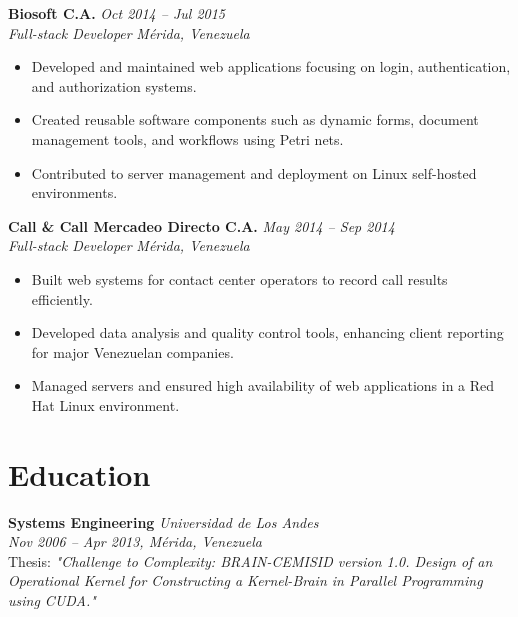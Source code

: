 \documentclass[a4paper,10pt]{article}
\begin{document}
\textbf{Biosoft C.A.} \hfill \textit{Oct 2014 -- Jul 2015}\\
\textit{Full-stack Developer} \hfill \textit{Mérida, Venezuela}\\
\begin{itemize}[leftmargin=0.5cm, topsep=0pt, parsep=0pt, itemsep=2pt]
	\item Developed and maintained web applications focusing on login,
	      authentication, and authorization systems.
	\item Created reusable software components such as dynamic forms, document
	      management tools, and workflows using Petri nets.
	\item Contributed to server management and deployment on Linux self-hosted
	      environments.
\end{itemize}

\textbf{Call \& Call Mercadeo Directo C.A.} \hfill \textit{May 2014 -- Sep 2014}\\
\textit{Full-stack Developer} \hfill \textit{Mérida, Venezuela}\\
\begin{itemize}[leftmargin=0.5cm, topsep=0pt, parsep=0pt, itemsep=2pt]
	\item Built web systems for contact center operators to record call results
	      efficiently.
	\item Developed data analysis and quality control tools, enhancing client
	      reporting for major Venezuelan companies.
	\item Managed servers and ensured high availability of web applications in
	      a Red Hat Linux environment.
\end{itemize}

\section*{Education}
\sectionline
\textbf{Systems Engineering} \hfill \textit{Universidad de Los Andes}\\
\textit{Nov 2006 -- Apr 2013, Mérida, Venezuela}\\
Thesis: \textit{"Challenge to Complexity: BRAIN-CEMISID version 1.0. Design of
	an Operational Kernel for Constructing a Kernel-Brain in Parallel Programming
	using CUDA."}

\end{document}
